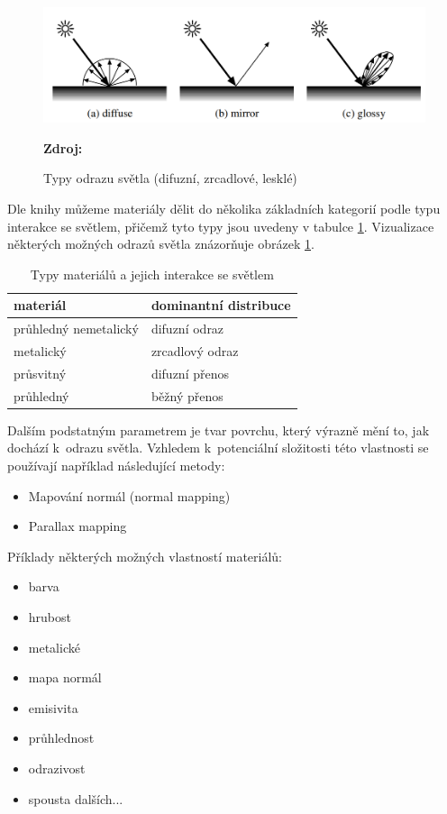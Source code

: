 \begin{figure}[H]
	\centering
	\includegraphics[scale=1]{obrazky-figures/reflection_types.png}
	\caption{Typy odrazu světla (difuzní, zrcadlové, lesklé)}
	\textbf{Zdroj: \cite{materials}}
	\label{fig:refl_types}
\end{figure}

Dle knihy \cite{hunter_harold_1987} můžeme materiály dělit do několika základních kategorií podle typu interakce se světlem, přičemž tyto typy jsou uvedeny v tabulce \ref{tab:mats_distr}. Vizualizace některých možných odrazů světla znázorňuje obrázek \ref{fig:refl_types}.

\begin{table}[H]
	\centering
	\begin{tabular}{|l|l|}
		\hline
		materiál              & dominantní distribuce \\ \hline
		průhledný nemetalický & difuzní odraz         \\ \hline
		metalický             & zrcadlový odraz       \\ \hline
		průsvitný             & difuzní přenos        \\ \hline
		průhledný             & běžný přenos          \\ \hline
	\end{tabular}
	\caption{Typy materiálů a jejich interakce se světlem}
	\label{tab:mats_distr}
\end{table}


Dalším podstatným parametrem je tvar povrchu, který výrazně mění to, jak dochází k~odrazu světla. Vzhledem k~potenciální složitosti této vlastnosti se používají například následující metody:

\begin{itemize}
	\item Mapování normál (normal mapping)
	\item Parallax mapping
\end{itemize}

Příklady některých možných vlastností materiálů:

\begin{itemize}
	\item barva
	\item hrubost
	\item metalické
	\item mapa normál
	\item emisivita
	\item průhlednost
	\item odrazivost
	\item spousta dalších...
\end{itemize}


